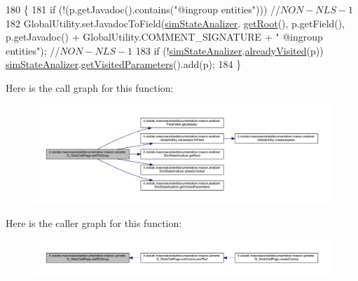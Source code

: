 \begin{DoxyCode}
180                                          \{
181         \textcolor{keywordflow}{if} (!(p.getJavadoc().contains(\textcolor{stringliteral}{"@ingroup entities"}))) \textcolor{comment}{//$NON-NLS-1$}
182             GlobalUtility.setJavadocToField(\hyperlink{classit_1_1isislab_1_1masonassisteddocumentation_1_1mason_1_1wizards_1_1_g___grids_cell_page_a7880d671931d7229eb3d46f54fcc5697}{simStateAnalizer}.
      \hyperlink{classit_1_1isislab_1_1masonassisteddocumentation_1_1mason_1_1analizer_1_1_sim_state_analizer_ad271c4ee4ffe808dcaa5fecc39cb7bd4}{getRoot}(), p.getField(), p.getJavadoc() + GlobalUtility.COMMENT\_SIGNATURE + \textcolor{stringliteral}{" @ingroup entities"}); \textcolor{comment}{
      //$NON-NLS-1$}
183         \textcolor{keywordflow}{if} (!\hyperlink{classit_1_1isislab_1_1masonassisteddocumentation_1_1mason_1_1wizards_1_1_g___grids_cell_page_a7880d671931d7229eb3d46f54fcc5697}{simStateAnalizer}.\hyperlink{classit_1_1isislab_1_1masonassisteddocumentation_1_1mason_1_1analizer_1_1_sim_state_analizer_a0a0e3dd3cbc27027c93a4f935382ac55}{alreadyVisited}(p))  
      \hyperlink{classit_1_1isislab_1_1masonassisteddocumentation_1_1mason_1_1wizards_1_1_g___grids_cell_page_a7880d671931d7229eb3d46f54fcc5697}{simStateAnalizer}.\hyperlink{classit_1_1isislab_1_1masonassisteddocumentation_1_1mason_1_1analizer_1_1_sim_state_analizer_a9fb2508f0bb14958d8aa2e409ae41f8d}{getVisitedParameters}().add(p);     
184     \}
\end{DoxyCode}


Here is the call graph for this function\-:
\nopagebreak
\begin{figure}[H]
\begin{center}
\leavevmode
\includegraphics[width=350pt]{classit_1_1isislab_1_1masonassisteddocumentation_1_1mason_1_1wizards_1_1_g___grids_cell_page_a874d5aab262342b54eb0bd9ea0e576ab_cgraph}
\end{center}
\end{figure}




Here is the caller graph for this function\-:
\nopagebreak
\begin{figure}[H]
\begin{center}
\leavevmode
\includegraphics[width=350pt]{classit_1_1isislab_1_1masonassisteddocumentation_1_1mason_1_1wizards_1_1_g___grids_cell_page_a874d5aab262342b54eb0bd9ea0e576ab_icgraph}
\end{center}
\end{figure}



